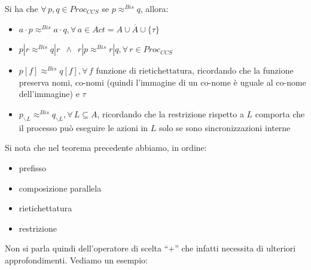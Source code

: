 \documentclass[a4paper,12pt, oneside]{book}
\begin{document}
\begin{teorema}
  Si ha che $\forall\,p,q\in Proc_{CCS}$ se $p\approx^{Bis}q$, allora:
  \begin{itemize}
    \item $a\cdot p\approx^{Bis} a\cdot q,\forall\, a\in
    Act=A\cup\overline{A}\cup\{\tau\}$ 
    \item $p|r\approx^{Bis}q|r\,\,\,\land \,\,\,
    r|p\approx^{Bis}r|q,\forall\,r\in Proc_{CCS}$  
    \item $p[f]\approx^{Bis}q[f],\forall\,f\mbox{ funzione di rietichettatura}$,
    ricordando che la funzione preserva nomi, co-nomi (quindi l'immagine di un
    co-nome è uguale al co-nome dell'immagine) e $\tau$
    \item $p_{\backslash L}\approx^{Bis}q_{\backslash L},\forall\,L\subseteq A$,
    ricordando che la restrizione rispetto a $L$ comporta che il processo può
    eseguire le azioni in $L$ solo se sono sincronizzazioni interne
  \end{itemize}
\end{teorema}
Si nota che nel teorema precedente abbiamo, in ordine:
\begin{itemize}
  \item prefisso
  \item composizione parallela
  \item rietichettatura
  \item restrizione
\end{itemize}
Non si parla quindi dell'operatore di scelta ``+'' che infatti necessita di
ulteriori approfondimenti. Vediamo un esempio:
\end{document}
